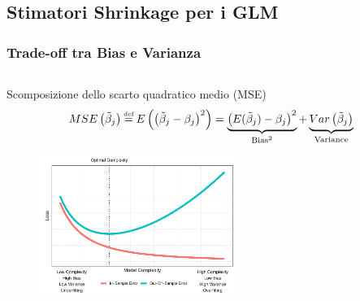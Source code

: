 \documentclass[pdf, aspectratio=169, xcolor=dvipsnames]{beamer}\usepackage[]{graphicx}\usepackage[]{color}
\newcommand\eqdef{\mathrel{\overset{\makebox[0pt]{\mbox{\normalfont\tiny def}}}{=}}}
\theoremstyle{definition}
\begin{document}
\subsection{Stimatori Shrinkage per i GLM}

\begin{frame}
\frametitle{Trade-off tra Bias e Varianza}

\fontsize{9pt}{11pt}\selectfont

\begin{columns}
\begin{column}{0.8\linewidth}
  \begin{block}{Scomposizione dello scarto quadratico medio (MSE)}
    $$
    MSE\left(\tilde{\beta}_j\right) \eqdef E\left(\left(\tilde{\beta}_j - \beta_j\right)^2\right) =
    \underbrace{\left( E(\tilde{\beta}_j)-\beta_j \right)^2}_{\text{Bias}^2} +
    \underbrace{Var\left( \tilde{\beta}_j \right)}_{\text{Variance}}
    $$
    \begin{figure}
      \centering
      \includegraphics[width=6.5cm]{_bookdown_files/_main_files/figure-latex/bias-variance-1.pdf}
    \end{figure}
  \end{block}
\end{column}
\end{columns}

\end{frame}
\end{document}

